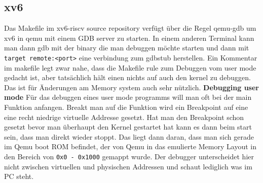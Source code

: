 
\subsection{xv6}
Das Makefile im xv6-riscv source repository verfügt über die Regel qemu-gdb um xv6 in qemu
mit einem GDB server zu starten. In einem anderen Terminal kann man dann gdb mit der binary
die man debuggen möchte starten und dann mit \texttt{target remote:<port>} eine verbindung
zum gdbstub herstellen.
Ein Kommentar im makefile legt zwar nahe, dass die Makefile rule zum Debuggen vom user mode
gedacht ist, aber tatsächlich hält einen nichts auf auch den kernel zu debuggen. Das ist
für Änderungen am Memory system auch sehr nützlich.
\textbf{Debugging user mode} Für das debuggen eines user mode programms will man oft bei
der main Funktion anfangen. Breakt man auf die Funktion wird ein Breakpoint auf eine eine recht
niedrige virtuelle Addresse gesetzt. Hat man den Breakpoint schon gesetzt bevor man überhaupt
den Kernel gestartet hat kann es dann beim start sein, dass man direkt wieder stoppt.
Das liegt dann daran, dass man sich gerade im Qemu boot ROM befindet, der von Qemu in
das emulierte Memory Layout in den Bereich von \texttt{0x0 - 0x1000} gemappt wurde.
Der debugger unterscheidet hier nicht zwischen virtuellen und physischen Addressen und
schaut lediglich was im PC steht.

